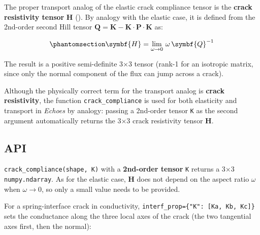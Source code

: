 \documentclass[
  a4paper,
  numbers=noendperiod,
  DIV=12]{scrreprt}
\newcommand{\uu}[1]{{\symbf{{#1}}}}
\begin{document}
The proper transport analog of the elastic crack compliance tensor is
the \textbf{crack resistivity tensor} \(\uu{H}\)
(). By
analogy with the elastic case, it is defined from the 2nd-order second
Hill tensor \(\uu{Q}=\uu{K}-\uu{K}\cdot\uu{P}\cdot\uu{K}\) as:

\begin{equation}\protect\phantomsection\label{eq-H-cond}{
\uu{H} = \lim_{\omega\to 0}\,\omega\,\uu{Q}^{-1}
}\end{equation}

The result is a positive semi-definite 3×3 tensor (rank-1 for an
isotropic matrix, since only the normal component of the flux can jump
across a crack).

\begin{tcolorbox}[enhanced jigsaw, arc=.35mm, bottomrule=.15mm, bottomtitle=1mm, breakable, colback=white, colbacktitle=quarto-callout-warning-color!10!white, colframe=quarto-callout-warning-color-frame, coltitle=black, left=2mm, leftrule=.75mm, opacityback=0, opacitybacktitle=0.6, rightrule=.15mm, title=\textcolor{quarto-callout-warning-color}{\faExclamationTriangle}\hspace{0.5em}{Terminology in \emph{Echoes}}, titlerule=0mm, toprule=.15mm, toptitle=1mm]

Although the physically correct term for the transport analog is
\textbf{crack resistivity}, the function \texttt{crack\_compliance} is
used for both elasticity and transport in \emph{Echoes} by analogy:
passing a 2nd-order tensor \texttt{K} as the second argument
automatically returns the 3×3 crack resistivity tensor \(\uu{H}\).

\end{tcolorbox}

\subsection{API}\label{api-1}

\texttt{crack\_compliance(shape,\ K)} with a \textbf{2nd-order tensor}
\texttt{K} returns a 3×3 \texttt{numpy.ndarray}. As for the elastic
case, \(\uu{H}\) does not depend on the aspect ratio \(\omega\) when
\(\omega\to 0\), so only a small value needs to be provided.

For a spring-interface crack in conductivity,
\texttt{interf\_prop=\{"K":\ {[}Ka,\ Kb,\ Kc{]}\}} sets the conductance
along the three local axes of the crack (the two tangential axes first,
then the normal):
\end{document}
